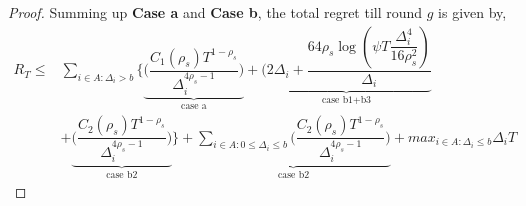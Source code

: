 \begin{proof}
Summing up \textbf{Case a} and \textbf{Case b}, the total regret till round $g$ is given by,
\begin{align*}
  R_{T} \leq &  \sum_{i\in A:\Delta_{i} > b}\bigg\lbrace\underbrace{\bigg(\dfrac{C_{1}(\rho_{s})T^{1-\rho_{s}}}{\Delta_{i}^{4\rho_{s}-1}}\bigg)}_{\text{case a}} + \underbrace{\bigg(2\Delta_{i}+\dfrac{64\rho_{s}\log{(\psi T\dfrac{\Delta_{i}^{4}}{16\rho_{s}^{2}})}}{\Delta_{i}} }_{\text{case b1+b3}} 
  \\&+ \underbrace{\bigg(\dfrac{C_{2}(\rho_{s})T^{1-\rho_{s}}}{\Delta_{i}^{4\rho_{s} -1}} \bigg)}_{\text{case b2}} \bigg\rbrace  + \underbrace{\sum_{i\in A:0\leq\Delta_{i}\leq b}\bigg(\dfrac{C_{2}(\rho_{s})T^{1-\rho_{s}}}{\Delta_{i}^{4\rho_{s} -1}} \bigg)}_{\text{case b2}}  + max_{i\in A:\Delta_{i}\leq b}\Delta_{i}T
\end{align*}



\end{proof}
